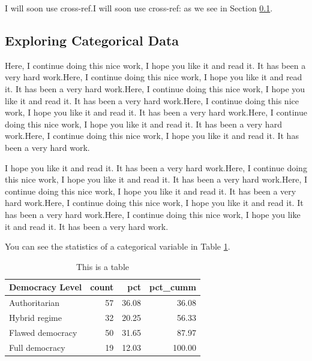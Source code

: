 \documentclass[a4paper, 12pt]{article}
\begin{document}
I will soon use cross-ref.I will soon use cross-ref: as we see in Section \ref{catexplor}.



\subsection{Exploring Categorical Data}\label{catexplor}

Here, I continue doing this nice work, I hope you like it and read it. It has been a very hard work.Here, I continue doing this nice work, I hope you like it and read it. It has been a very hard work.Here, I continue doing this nice work, I hope you like it and read it. It has been a very hard work.Here, I continue doing this nice work, I hope you like it and read it. It has been a very hard work.Here, I continue doing this nice work, I hope you like it and read it. It has been a very hard work.Here, I continue doing this nice work, I hope you like it and read it. It has been a very hard work.

I hope you like it and read it. It has been a very hard work.Here, I continue doing this nice work, I hope you like it and read it. It has been a very hard work.Here, I continue doing this nice work, I hope you like it and read it. It has been a very hard work.Here, I continue doing this nice work, I hope you like it and read it. It has been a very hard work.Here, I continue doing this nice work, I hope you like it and read it. It has been a very hard work.

You can see the statistics of a categorical variable in Table \ref{catexploreTable}.


\begin{table}[!h]

\caption{This is a table\label{catexploreTable}}
\centering
\begin{tabular}[t]{l|r|r|r}
\hline
Democracy Level & count & pct & pct\_cumm\\
\hline
Authoritarian & 57 & 36.08 & 36.08\\
\hline
Hybrid regime & 32 & 20.25 & 56.33\\
\hline
Flawed democracy & 50 & 31.65 & 87.97\\
\hline
Full democracy & 19 & 12.03 & 100.00\\
\hline
\end{tabular}
\end{table}
\end{document}
